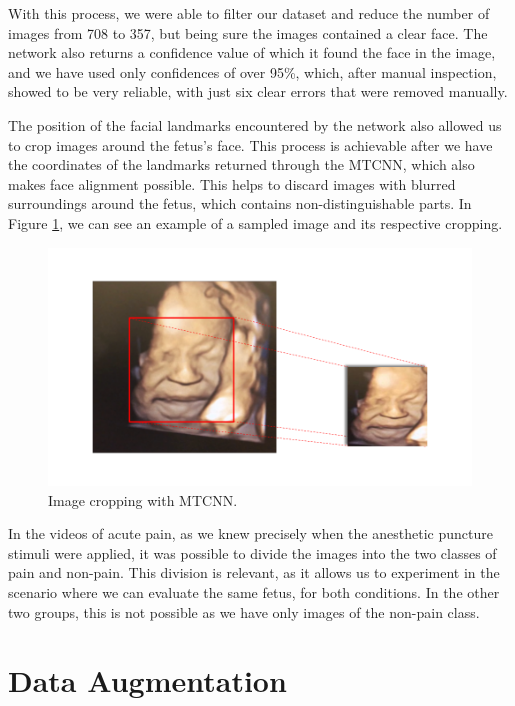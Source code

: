 With this process, we were able to filter our dataset and reduce the number of images from 708 to 357, but being sure the images contained a clear face. The network also returns a confidence value of which it found the face in the image, and we have used only confidences of over 95\%, which, after manual inspection, showed to be very reliable, with just six clear errors that were removed manually.

The position of the facial landmarks encountered by the network also allowed us to crop images around the fetus's face. This process is achievable after we have the coordinates of the landmarks returned through the MTCNN, which also makes face alignment possible. This helps to discard images with blurred surroundings around the fetus, which contains non-distinguishable parts. In Figure \ref{fig:cropping}, we can see an example of a sampled image and its respective cropping.

\begin{figure}[h!tp]
    \centering
    \includegraphics[width=.95\textwidth]{imgs/chap5_cropping.png}
    \caption{Image cropping with MTCNN.}
    \label{fig:cropping}
\end{figure}

In the videos of acute pain, as we knew precisely when the anesthetic puncture stimuli were applied, it was possible to divide the images into the two classes of pain and non-pain. This division is relevant, as it allows us to experiment in the scenario where we can evaluate the same fetus, for both conditions. In the other two groups, this is not possible as we have only images of the non-pain class.

\section{Data Augmentation}

